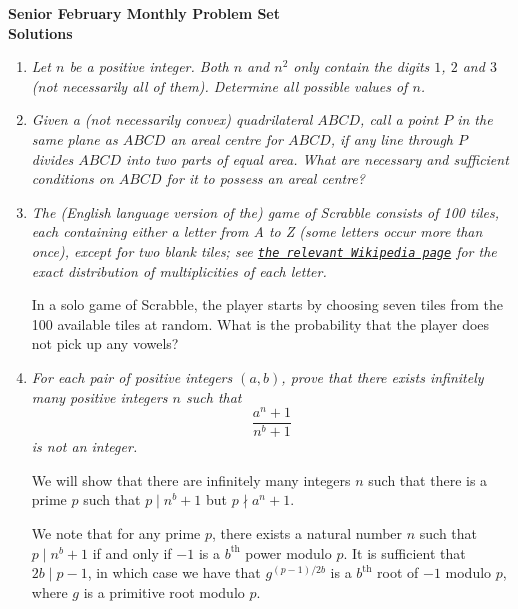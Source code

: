 \documentclass{article}
\begin{document}
\begin{center}
\textbf{\Large Senior February Monthly Problem Set}
\\ \vspace{1em}
\textbf{\large Solutions}
\end{center}

\begin{enumerate}[1.]

\item %
{\itshape Let $n$ be a positive integer. Both $n$ and $n^2$ only contain the digits $1$, $2$ and $3$ (not necessarily all of them). Determine all possible values of $n$.}


\vspace{6pt}
\item %
{\itshape Given a (not necessarily convex) quadrilateral $ABCD$, call a point $P$ in the same plane as $ABCD$ an \emph{areal centre} for $ABCD$, if any line through $P$ divides $ABCD$ into two parts of equal area. What are necessary and sufficient conditions on $ABCD$ for it to possess an areal centre?}


\vspace{6pt}
\item %
{\itshape The (English language version of the) game of Scrabble\texttrademark{} consists of 100 tiles, each containing either a letter from A to Z (some letters occur more than once), except for two blank tiles; see \href{https://en.wikipedia.org/wiki/Scrabble_letter_distributions#English}{\texttt{the relevant Wikipedia page}} for the exact distribution of multiplicities of each letter.

In a solo game of Scrabble, the player starts by choosing seven tiles from the 100 available tiles at random. What is the probability that the player does not pick up any vowels?}


\vspace{6pt}
\item %
{\itshape For each pair of positive integers $(a, b)$, prove that there exists infinitely many positive integers $n$ such that
\[ \frac{a^n + 1}{n^b + 1} \]
is not an integer.}

We will show that there are infinitely many integers $n$ such that there is a prime $p$ such that $p \mid n^b + 1$ but $p \nmid a^n + 1$.

We note that for any prime $p$, there exists a natural number $n$ such that $p \mid n^b + 1$ if and only if $-1$ is a $b^\text{th}$ power modulo $p$. It is sufficient that $2b \mid p - 1$, in which case we have that $g^{(p - 1)/2b}$ is a $b^\text{th}$ root of $-1$ modulo $p$, where $g$ is a primitive root modulo $p$.


\end{enumerate}
\end{document}
